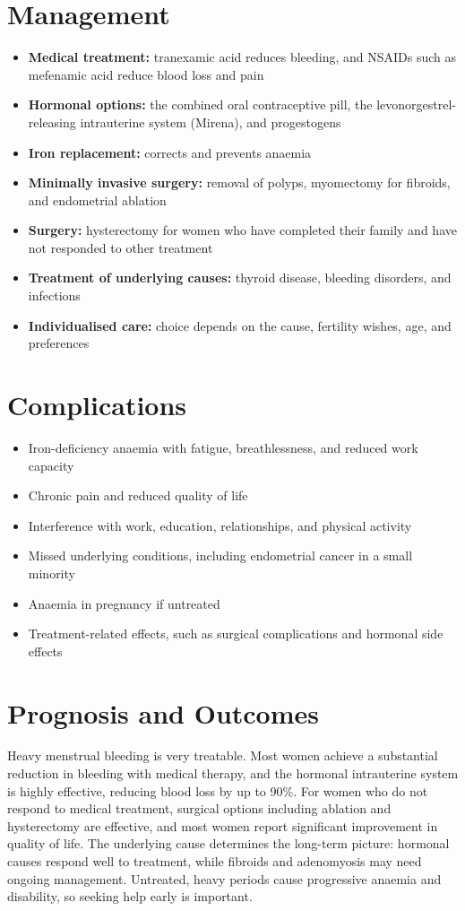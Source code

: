 \section*{Management}
\begin{itemize}
    \item \textbf{Medical treatment:} tranexamic acid reduces bleeding, and NSAIDs such as mefenamic acid reduce blood loss and pain
    \item \textbf{Hormonal options:} the combined oral contraceptive pill, the levonorgestrel-releasing intrauterine system (Mirena), and progestogens
    \item \textbf{Iron replacement:} corrects and prevents anaemia
    \item \textbf{Minimally invasive surgery:} removal of polyps, myomectomy for fibroids, and endometrial ablation
    \item \textbf{Surgery:} hysterectomy for women who have completed their family and have not responded to other treatment
    \item \textbf{Treatment of underlying causes:} thyroid disease, bleeding disorders, and infections
    \item \textbf{Individualised care:} choice depends on the cause, fertility wishes, age, and preferences
\end{itemize}

\section*{Complications}
\begin{itemize}
    \item Iron-deficiency anaemia with fatigue, breathlessness, and reduced work capacity
    \item Chronic pain and reduced quality of life
    \item Interference with work, education, relationships, and physical activity
    \item Missed underlying conditions, including endometrial cancer in a small minority
    \item Anaemia in pregnancy if untreated
    \item Treatment-related effects, such as surgical complications and hormonal side effects
\end{itemize}

\section*{Prognosis and Outcomes}
Heavy menstrual bleeding is very treatable. Most women achieve a substantial reduction in bleeding with medical therapy, and the hormonal intrauterine system is highly effective, reducing blood loss by up to 90\%. For women who do not respond to medical treatment, surgical options including ablation and hysterectomy are effective, and most women report significant improvement in quality of life. The underlying cause determines the long-term picture: hormonal causes respond well to treatment, while fibroids and adenomyosis may need ongoing management. Untreated, heavy periods cause progressive anaemia and disability, so seeking help early is important.

